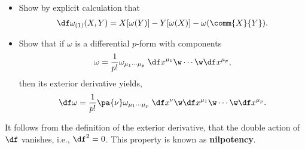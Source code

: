 \begin{Ebox}
  \begin{itemize}
  \item Show by explicit calculation that
    \begin{align}
      \df\omega_{(1)}(X,Y) = X[\omega(Y)]-Y[\omega(X)]-\omega(\comm{X}{Y}).
    \end{align}
  \item Show that if $\omega$ is a differential $p$-form with components
    \begin{align}
      \omega = \frac{1}{p!}\omega_{\mu_1\cdots\mu_p}\;\df x^{\mu_1}\w\cdots\w\df x^{\mu_p},
    \end{align}
    then its exterior derivative yields,
    \begin{align}
      \df\omega = \frac{1}{p!}\pa{\nu}\omega_{\mu_1\cdots\mu_p}\;\df x^\nu\w\df x^{\mu_1}\w\cdots\w\df x^{\mu_p}.
    \end{align}
  \end{itemize}
\end{Ebox}


It follows from the definition of the exterior derivative, that the double action of $\df$ vanishes, i.e., $\df^2=0$. This property is known as {\bf nilpotency}.





